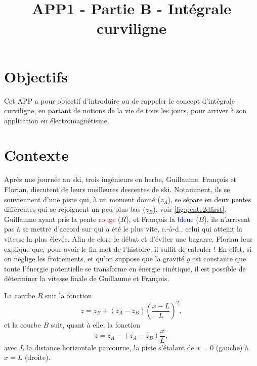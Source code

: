\documentclass[10pt,oneside]{article}
\author{}
\title{APP1 - Partie B - Intégrale curviligne}
\date{}
\begin{document}
\maketitle
\thispagestyle{fancy}
\section{Objectifs}

Cet APP a pour objectif d'introduire ou de rappeler le concept d'intégrale curviligne, en partant de notions de la vie de tous les jours, pour arriver à son application en électromagnétisme.


\section{Contexte}


Après une journée au ski, trois ingénieurs en herbe, Guillaume, François et Florian, discutent de leurs meilleures descentes de ski. Notamment, ils se souviennent d'une piste qui, à un moment donné ($z_A$), se sépare en deux pentes différentes qui se rejoignent un peu plus bas ($z_B$), voir \autoref{fig:pente2dfirst}. Guillaume ayant pris la pente \textcolor{red}{rouge} ($R$), et François la \textcolor{blue}{bleue} ($B$), ils n'arrivent pas à se mettre d'accord sur qui a été le plus vite, c.-à-d., celui qui atteint la vitesse la plus élevée. Afin de clore le débat et d'éviter une bagarre, Florian leur explique que, pour avoir le fin mot de l'histoire, il suffit de calculer ! En effet, si on néglige les frottements, et qu'on suppose que la gravité $g$ est constante que toute l'énergie potentielle se transforme en énergie cinétique, il est possible de déterminer la vitesse finale de Guillaume et François.

La courbe $R$ suit la fonction
\begin{equation}
    z = z_B + (z_A - z_B)\left(\frac{x-L}{L}\right)^2,
\end{equation}
et la courbe $B$ suit, quant à elle, la fonction
\begin{equation}
    z = z_A - (z_A - z_B)\frac{x}{L},
\end{equation}
avec $L$ la distance horizontale parcourue, la piste s'étalant de $x=0$ (gauche) à $x=L$ (droite).

\end{document}
